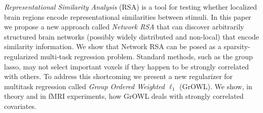 \emph{Representational Similarity Analysis} (RSA) is a tool for testing whether localized
brain regions encode representational similarities between stimuli.  In this paper we
propose a new approach called {\em Network RSA} that can discover arbitrarily structured
brain networks (possibly widely distributed and non-local) that encode similarity
information.  We show that Network RSA can be posed as a sparsity-regularized multi-task
regression problem. Standard methods, such as the group lasso, may not select important
voxels if they happen to be strongly correlated with others. To address this shortcoming
we present a new regularizer for multitask regression called \emph{Group Ordered Weighted
$\ell_1$} (GrOWL). We show, in theory and in fMRI experiments, how GrOWL deals with
strongly correlated covariates.
